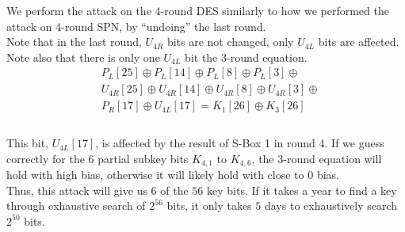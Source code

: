 \documentclass[9pt]{beamer}
\begin{document}
\begin{frame}
\begin{columns}
\begin{column}{0.65\textwidth}
\small
We perform the attack on the 4-round DES similarly to how we performed the attack on 4-round SPN, by ``undoing'' the last round.\\
\vspace{3mm}
\pause
Note that in the last round, $U_{4R}$ bits are not changed, only $U_{4L}$ bits are affected. Note also that there is only one $U_{4L}$ bit the 3-round equation.\\
\begin{align*} 
& P_L[25]    \oplus P_L[14]    \oplus P_L[8]    \oplus P_L[3] \oplus  \\
& U_{4R}[25] \oplus U_{4R}[14] \oplus U_{4R}[8] \oplus U_{4R}[3]  \oplus \\ 
& P_R[17]    \oplus U_{4L}[17] = K_1[26] \oplus K_3[26] \\
\end{align*}\\
\vspace{3mm}
\pause
This bit, $U_{4L}[17]$, is affected by the result of S-Box 1 in round 4. If we guess correctly for the 6 partial subkey bits $K_{4,1}$ to $K_{4,6}$, the 3-round equation will hold with high bias, otherwise it will likely hold with close to 0 bias.\\
\vspace{3mm}
\pause
Thus, this attack will give us $6$ of the $56$ key bits. If it takes a year to find a key through exhaustive search of $2^{56}$ bits, it only takes $5$ days to exhaustively search $2^{50}$ bits.
\end{column}

\end{columns}
\end{frame}
\end{document}
